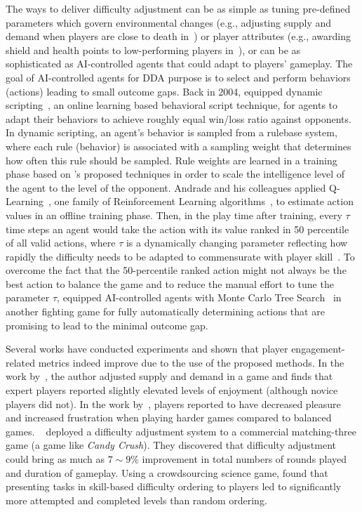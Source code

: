 The ways to deliver difficulty adjustment can be as simple as tuning pre-defined parameters which govern environmental changes (e.g., adjusting supply and demand when players are close to death in~\cite{hunicke2005case}) or player attributes (e.g., awarding shield and health points to low-performing players in~\cite{baldwin2014effect}), or can be as sophisticated as AI-controlled agents that could adapt to players' gameplay. The goal of AI-controlled agents for DDA purpose is to select and perform behaviors (actions) leading to small outcome gaps. Back in 2004, \textcite{spronck2004difficulty} equipped dynamic scripting~\citep{spronck2004online}, an online learning based behavioral script technique, for agents to adapt their behaviors to achieve roughly equal win/loss ratio against opponents. In dynamic scripting, an agent's behavior is sampled from a rulebase system, where each rule (behavior) is associated with a sampling weight that determines how often this rule should be sampled. Rule weights are learned in a training phase based on \textcite{spronck2004difficulty}'s proposed techniques in order to scale the intelligence level of the agent to the level of the opponent. Andrade and his colleagues applied Q-Learning~\citep{watkins1992q}, one family of Reinforcement Learning algorithms~\citep{sutton1998reinforcement}, to estimate action values in an offline training phase. Then, in the play time after training, every $\tau$ time steps an agent would take the action with its value ranked in 50 percentile of all valid actions, where $\tau$ is a dynamically changing parameter reflecting how rapidly the difficulty needs to be adapted to commensurate with player skill~\citep{andrade2006dynamic,andrade2005challenge,andrade2005extending}. To overcome the fact that the 50-percentile ranked action might not always be the best action to balance the game and to reduce the manual effort to tune the parameter $\tau$, \citep{demediuk2017monte} equipped AI-controlled agents with Monte Carlo Tree Search~\citep{browne2012survey} in another fighting game for fully automatically determining actions that are promising to lead to the minimal outcome gap. 

Several works have conducted experiments and shown that player engagement-related metrics indeed improve due to the use of the proposed methods. In the work by~\textcite{hunicke2005case}, the author adjusted supply and demand in a game and finds that expert players reported slightly elevated levels of enjoyment (although novice players did not). In the work by~\textcite{van2009incongruity}, players reported to have decreased pleasure and increased frustration when playing harder games compared to balanced games. ~\textcite{xue2017dynamic} deployed a difficulty adjustment system to a commercial matching-three game (a game like \textit{Candy Crush}). They discovered that difficulty adjustment could bring as much as $7 \sim 9 \%$ improvement in total numbers of rounds played and duration of gameplay. Using a crowdsourcing science game, \textcite{sarkar2017engagement} found that presenting 
tasks in skill-based difficulty ordering to players led to significantly more attempted and completed levels than random ordering. 

